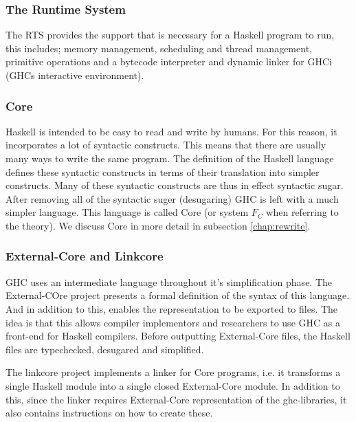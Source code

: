 \subsubsection{The Runtime System}

The RTS provides the support that is necessary for a Haskell program to run, this
includes; memory management, scheduling and thread management, primitive operations
and a bytecode interpreter and dynamic linker for GHCi (GHCs interactive environment).
\cite{marlow2012glasgow} 

\subsubsection{Core}

Haskell is intended to be easy to read and write by humans. For this reason, it
incorporates a lot of syntactic constructs. This means that there are
usually many ways to write the same program. The definition of the Haskell language
defines these syntactic constructs in terms of their translation into simpler
constructs. Many of these syntactic constructs are thus in effect syntactic sugar.
After removing all of the syntactic suger (desugaring) GHC is left with a much 
simpler language. This language is called Core (or system $F_C$ when referring to
the theory).\cite{marlow2012glasgow} We discuss Core in more detail in subsection 
\ref{chap:rewrite}.

\subsubsection{External-Core and Linkcore}

GHC uses an intermediate language throughout it's 
simplification phase. The External-COre project presents a formal definition of the syntax 
of this language. And in addition to this, enables the representation to be exported 
to files. The idea is that this allows compiler implementors and researchers to use GHC
as a front-end for Haskell compilers. Before outputting External-Core files,
the Haskell files are typechecked, desugared and simplified. \cite{tolmach2010ghc}

The linkcore project implements a linker for Core programs, i.e. it transforms
a single Haskell module into a single closed External-Core module. In addition to
this, since the linker requires External-Core representation of the ghc-libraries,
it also contains instructions on how to create these. 

